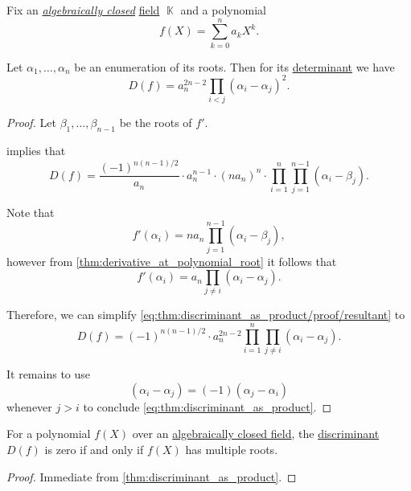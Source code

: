 \begin{proposition}\label{thm:discriminant_as_product}
  Fix an \hyperref[def:algebraically_closed_field]{\emph{algebraically closed}} \hyperref[def:field]{field} \( \BbbK \) and a polynomial
  \begin{equation*}
    f(X) = \sum_{k=0}^n a_k X^k.
  \end{equation*}

  Let \( \alpha_1, \ldots, \alpha_n \) be an enumeration of its roots. Then for its \hyperref[def:matrix_determinant]{determinant} we have
  \begin{equation}\label{eq:thm:discriminant_as_product}
    D(f) = a_n^{2n - 2} \prod_{i < j} (\alpha_i - \alpha_j)^2.
  \end{equation}
\end{proposition}
\begin{proof}
  Let \( \beta_1, \ldots, \beta_{n-1} \) be the roots of \( f' \).

   implies that
  \begin{equation}\label{eq:thm:discriminant_as_product/proof/resultant}
    D(f) = \frac {(-1)^{n(n-1)/2}} {a_n} \cdot a_n^{n-1} \cdot (n a_n)^n \cdot \prod_{i=1}^n \prod_{j=1}^{n-1} (\alpha_i - \beta_j).
  \end{equation}

  Note that
  \begin{equation*}
    f'(\alpha_i) = n a_n \prod_{j=1}^{n-1} (\alpha_i - \beta_j),
  \end{equation*}
  however from \cref{thm:derivative_at_polynomial_root} it follows that
  \begin{equation*}
    f'(\alpha_i) = a_n \prod_{j \neq i} (\alpha_i - \alpha_j).
  \end{equation*}

  Therefore, we can simplify \eqref{eq:thm:discriminant_as_product/proof/resultant} to
  \begin{equation*}
    D(f) = (-1)^{n(n-1)/2} \cdot a_n^{2n-2} \prod_{i=1}^n \prod_{j \neq i} (\alpha_i - \alpha_j).
  \end{equation*}

  It remains to use
  \begin{equation*}
    (\alpha_i - \alpha_j) = (-1)(\alpha_j - \alpha_i)
  \end{equation*}
  whenever \( j > i \) to conclude \eqref{eq:thm:discriminant_as_product}.
\end{proof}

\begin{corollary}\label{thm:discriminant_invertibility}
  For a polynomial \( f(X) \) over an \hyperref[def:algebraically_closed_field]{algebraically closed field}, the \hyperref[def:discriminant]{discriminant} \( D(f) \) is zero if and only if \( f(X) \) has multiple roots.
\end{corollary}
\begin{proof}
  Immediate from \cref{thm:discriminant_as_product}.
\end{proof}

